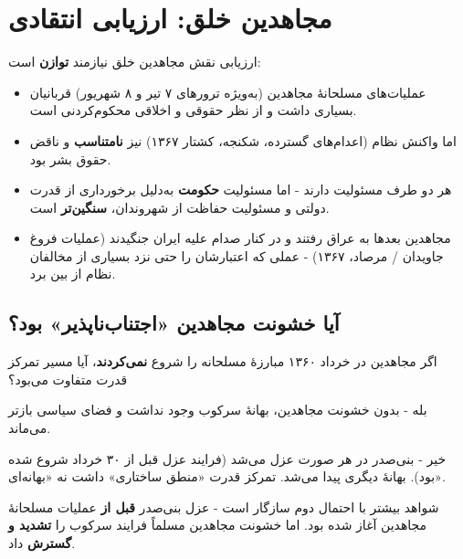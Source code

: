 \documentclass[12pt,a4paper]{book}
\newcommand{\keyword}[1]{\textbf{\textcolor{cPrimary}{#1}}}
\newcommand{\en}[1]{\lr{\textit{#1}}}
\begin{document}
\section{مجاهدین خلق: ارزیابی انتقادی}

\begin{noteBox}
ارزیابی نقش مجاهدین خلق نیازمند \keyword{توازن} است:
\begin{itemize}[label=\textcolor{cGold}{$\bullet$}, rightmargin=2em]
    \item عملیات‌های مسلحانهٔ مجاهدین (به‌ویژه ترورهای ۷ تیر و ۸ شهریور) قربانیان بسیاری داشت و از نظر حقوقی و اخلاقی محکوم‌کردنی است.
    \item اما واکنش نظام (اعدام‌های گسترده، شکنجه، کشتار ۱۳۶۷) نیز \keyword{نامتناسب} و ناقض حقوق بشر بود.
    \item هر دو طرف مسئولیت دارند - اما مسئولیت \keyword{حکومت} به‌دلیل برخورداری از قدرت دولتی و مسئولیت حفاظت از شهروندان، \keyword{سنگین‌تر} است.
    \item مجاهدین بعدها به عراق رفتند و در کنار صدام علیه ایران جنگیدند (عملیات فروغ جاویدان / مرصاد، ۱۳۶۷) - عملی که اعتبارشان را حتی نزد بسیاری از مخالفان نظام از بین برد.
\end{itemize}
\end{noteBox}

\subsection{آیا خشونت مجاهدین «اجتناب‌ناپذیر» بود؟}

\begin{warningBox}[پرسش ضدواقعی (\en{counterfactual})]
اگر مجاهدین در خرداد ۱۳۶۰ مبارزهٔ مسلحانه را شروع \keyword{نمی‌کردند}، آیا مسیر تمرکز قدرت متفاوت می‌بود؟

\begin{description}[style=nextline, font=\bfseries\color{cPrimary}]
    \item[احتمال اول:] بله - بدون خشونت مجاهدین، بهانهٔ سرکوب وجود نداشت و فضای سیاسی بازتر می‌ماند.

    \item[احتمال دوم:] خیر - بنی‌صدر در هر صورت عزل می‌شد (فرایند عزل قبل از ۳۰ خرداد شروع شده بود). بهانهٔ دیگری پیدا می‌شد. تمرکز قدرت «منطق ساختاری» داشت نه «بهانه‌ای».

    \item[ارزیابی:] شواهد بیشتر با احتمال دوم سازگار است - عزل بنی‌صدر \keyword{قبل از} عملیات مسلحانهٔ مجاهدین آغاز شده بود. اما خشونت مجاهدین مسلماً فرایند سرکوب را \keyword{تشدید و گسترش} داد.
\end{description}
\end{warningBox}
\end{document}
